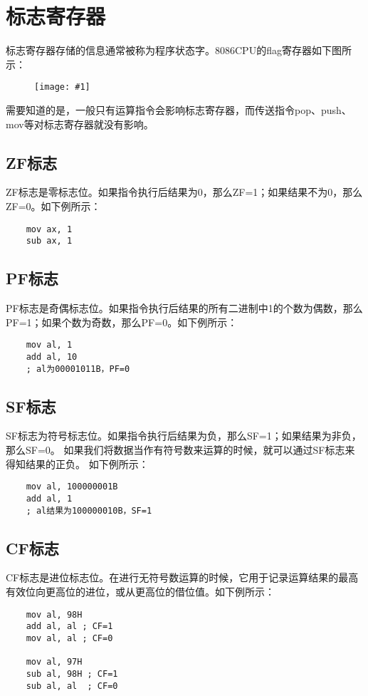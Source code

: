 \documentclass[a4paper,left=2.5cm,right=2.5cm,11pt]{article}
\newcommand{\fic}[1]{\begin{figure}[H]
		\center
		\texttt{[image: \#1]}
	\end{figure}}
\begin{document}
\tableofcontents

\clearpage

\section{标志寄存器}
	标志寄存器存储的信息通常被称为程序状态字。8086CPU的flag寄存器如下图所示：
	\fic{1.png}

	需要知道的是，一般只有运算指令会影响标志寄存器，而传送指令pop、push、mov等对标志寄存器就没有影响。

\subsection{ZF标志}
	ZF标志是零标志位。如果指令执行后结果为0，那么ZF=1；如果结果不为0，那么ZF=0。如下例所示：
	\begin{lstlisting}
	mov ax, 1
	sub ax, 1
	\end{lstlisting}

\subsection{PF标志}
	PF标志是奇偶标志位。如果指令执行后结果的所有二进制中1的个数为偶数，那么PF=1；如果个数为奇数，那么PF=0。如下例所示：
	\begin{lstlisting}
	mov al, 1
	add al, 10
	; al为00001011B，PF=0
	\end{lstlisting}

\subsection{SF标志}
	SF标志为符号标志位。如果指令执行后结果为负，那么SF=1；如果结果为非负，那么SF=0。
	如果我们将数据当作有符号数来运算的时候，就可以通过SF标志来得知结果的正负。
	如下例所示：
	\begin{lstlisting}
	mov al, 100000001B
	add al, 1
	; al结果为100000010B，SF=1
	\end{lstlisting}

\subsection{CF标志}
	CF标志是进位标志位。在进行无符号数运算的时候，它用于记录运算结果的最高有效位向更高位的进位，或从更高位的借位值。如下例所示：
	\begin{lstlisting}
	mov al, 98H
	add al, al ; CF=1
	mov al, al ; CF=0

	mov al, 97H
	sub al, 98H ; CF=1
	sub al, al  ; CF=0
	\end{lstlisting}
\end{document}
